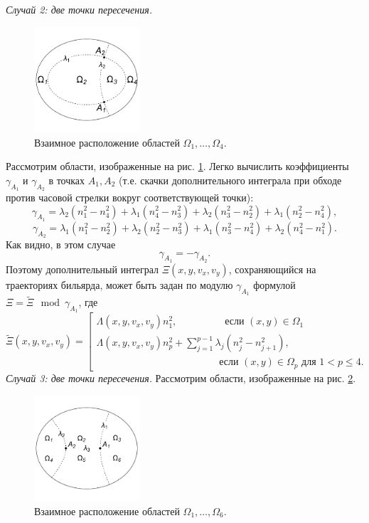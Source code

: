 \bigskip
{\it Случай 2: две точки пересечения.}
\begin{figure}[!htb]
\centering
   \includegraphics[width=0.35\textwidth]{images/section1/img3.pdf}   
    \caption{Взаимное расположение областей $\Omega_1, \ldots, \Omega_4$.}
    \label{fig:pt8:_example7}
\end{figure}
Рассмотрим области, изображенные на рис. \ref{fig:pt8:_example7}. 
Легко вычислить коэффициенты $\gamma_{A_1}$ и $\gamma_{A_2}$ в точках $A_1, A_2$ (т.е. скачки дополнительного интеграла при обходе против часовой стрелки вокруг соответствующей точки):
$$\gamma_{A_1} = \lambda_2(n_1^2 - n_4^2) + \lambda_1(n_4^2-n_3^2) + \lambda_2(n_3^2-n_2^2) + \lambda_1(n_2^2-n_4^2), $$
$$\gamma_{A_2} = \lambda_1(n_1^2 - n_2^2) + \lambda_2(n_2^2-n_3^2) + \lambda_1(n_3^2-n_4^2) + \lambda_2(n_4^2-n_1^2). $$
Как видно, в этом случае $$\gamma_{A_1} = -\gamma_{A_2}.$$
Поэтому дополнительный интеграл $\Xi(x, y, v_x, v_y)$, сохраняющийся на траекториях бильярда, может быть задан по модулю $\gamma_{A_1}$ формулой $\Xi = \widetilde{\Xi} \mod \gamma_{A_1}$, где 
\begin{equation*}
\widetilde{\Xi}(x, y, v_x, v_y) = \left[
\begin{array}{ll}
    \Lambda(x, y, v_x, v_y) n_1^2,  \qquad \ \  \qquad  \text{ если } (x,y) \in \Omega_1 
    \\
    \Lambda(x, y, v_x, v_y) n_p^2 + 
    \sum_{j=1}^{p-1} \lambda_j(n_j^2-n_{j+1}^2), \\
     \qquad \qquad  \qquad \qquad  \qquad \qquad \text{ если } (x,y) \in \Omega_p \text{ для } 1 < p \leq 4. 
\end{array}
\right.
\end{equation*}
 \medskip
{\it Случай 3: две точки пересечения.}
Рассмотрим области, изображенные на рис. \ref{fig:pt8:_example8}. 
\begin{figure}[!htb]
\centering
   \includegraphics[width=0.35\textwidth]{images/section1/img4.pdf}   
    \caption{Взаимное расположение областей $\Omega_1, \ldots, \Omega_6$.}
    \label{fig:pt8:_example8}
\end{figure}


